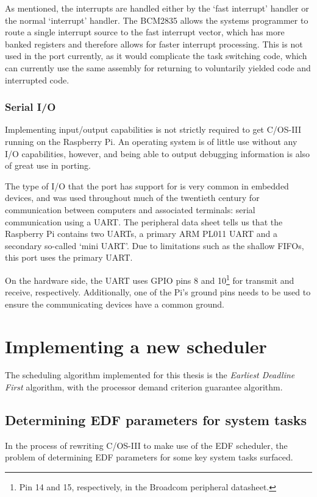 \documentclass[twoside]{uva-inf-bachelor-thesis}
\newcommand{\ucosiii}{\textmu C/OS-III\xspace}
\begin{document}
As mentioned, the interrupts are handled either by the `fast interrupt' handler or the normal `interrupt' handler. The BCM2835 allows the systems programmer to route a single interrupt source to the fast interrupt vector, which has more banked registers and therefore allows for faster interrupt processing. This is not used in the port currently, as it would complicate the task switching code, which can currently use the same assembly for returning to voluntarily yielded code and interrupted code.

\subsection{Serial I/O} \label{sec:miniuart}
Implementing input/output capabilities is not strictly required to get \ucosiii running on the Raspberry Pi. An operating system is of little use without any I/O capabilities, however, and being able to output debugging information is also of great use in porting.

The type of I/O that the port has support for is very common in embedded devices, and was used throughout much of the twentieth century for communication between computers and associated terminals: serial communication using a UART. The peripheral data sheet tells us that the Raspberry Pi contains two UARTs, a primary ARM PL011 UART and a secondary so-called `mini UART'. Due to limitations such as the shallow FIFOs, this port uses the primary UART.

On the hardware side, the UART uses GPIO pins 8 and 10\footnote{Pin 14 and 15, respectively, in the Broadcom peripheral datasheet.} for transmit and receive, respectively. Additionally, one of the Pi's ground pins needs to be used to ensure the communicating devices have a common ground.

%
%
%
%

\chapter{Implementing a new scheduler}
The scheduling algorithm implemented for this thesis is the \emph{Earliest Deadline First} algorithm, with the processor demand criterion guarantee algorithm.

\section{Determining EDF parameters for system tasks}
In the process of rewriting \ucosiii to make use of the EDF scheduler, the problem of determining EDF parameters for some key system tasks surfaced.
\end{document}
